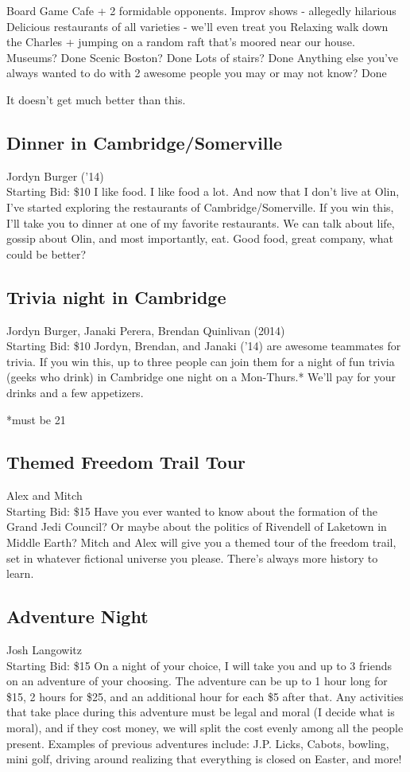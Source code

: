 \documentclass[11pt]{article}
\begin{document}
Board Game Cafe + 2 formidable opponents. 
Improv shows - allegedly hilarious 
Delicious restaurants of all varieties - we'll even treat you
Relaxing walk down the Charles + jumping on a random raft that's moored near our house. 
Museums? Done
Scenic Boston? Done
Lots of stairs? Done
Anything else you've always wanted to do with 2 awesome people you may or may not know? Done

It doesn't get much better than this.
\subsection{Dinner in Cambridge/Somerville}
Jordyn Burger ('14)
\\
Starting Bid: \$10
\newline
I like food. I like food a lot. And now that I don't live at Olin, I've started exploring the restaurants of Cambridge/Somerville. If you win this, I'll take you to dinner at one of my favorite restaurants. We can talk about life, gossip about Olin, and most importantly, eat. Good food, great company, what could be better?
\subsection{Trivia night in Cambridge}
Jordyn Burger, Janaki Perera, Brendan Quinlivan (2014)
\\
Starting Bid: \$10
\newline
Jordyn, Brendan, and Janaki (’14) are awesome teammates for trivia. If you win this, up to three people can join them for a night of fun trivia (geeks who drink) in Cambridge one night on a Mon-Thurs.* We’ll pay for your drinks and a few appetizers.
 
*must be 21
\subsection{Themed Freedom Trail Tour}
Alex and Mitch
\\
Starting Bid: \$15
\newline
Have you ever wanted to know about the formation of the Grand Jedi Council?
Or maybe about the politics of Rivendell of Laketown in Middle Earth?
Mitch and Alex will give you a themed tour of the freedom trail, set in whatever fictional universe you please. There's always more history to learn.
\subsection{Adventure Night}
Josh Langowitz
\\
Starting Bid: \$15
\newline
On a night of your choice, I will take you and up to 3 friends on an adventure of your choosing. The adventure can be up to 1 hour long for \$15, 2 hours for \$25, and an additional hour for each \$5 after that. Any activities that take place during this adventure must be legal and moral (I decide what is moral), and if they cost money, we will split the cost evenly among all the people present. Examples of previous adventures include: J.P. Licks, Cabots, bowling, mini golf, driving around realizing that everything is closed on Easter, and more!
\end{document}
